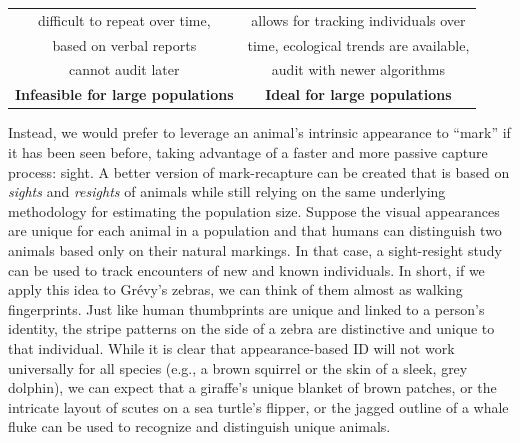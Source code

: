 \begin{table}[!t]
\begin{center}
\begin{tabular}{| c | c |}
            difficult to repeat over time,                        & allows for tracking individuals over                   \\
            based on verbal reports                               & time, ecological trends are available,                 \\
            cannot audit later                                    & audit with newer algorithms                            \\
            \hline
            \textbf{\color{red} Infeasible for large populations} & \textbf{\color{darkgreen} Ideal for large populations} \\
            \hline
        \end{tabular}
    \end{center}
\end{table}

Instead, we would prefer to leverage an animal's intrinsic appearance to ``mark'' if it has been seen before, taking advantage of a faster and more passive capture process: sight.  A better version of mark-recapture can be created that is based on \textit{sights} and \textit{resights} of animals while still relying on the same underlying methodology for estimating the population size.  Suppose the visual appearances are unique for each animal in a population and that humans can distinguish two animals based only on their natural markings. In that case, a sight-resight study can be used to track encounters of new and known individuals.  In short, if we apply this idea to Gr\'evy's zebras, we can think of them almost as walking fingerprints.  Just like human thumbprints are unique and linked to a person's identity, the stripe patterns on the side of a zebra are distinctive and unique to that individual.  While it is clear that appearance-based ID will not work universally for all species (e.g., a brown squirrel or the skin of a sleek, grey dolphin), we can expect that a giraffe's unique blanket of brown patches, or the intricate layout of scutes on a sea turtle's flipper, or the jagged outline of a whale fluke can be used to recognize and distinguish unique animals.

